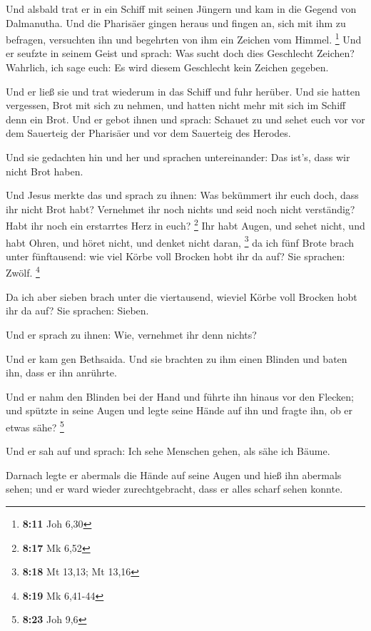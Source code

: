  Und alsbald trat er in ein Schiff mit seinen Jüngern und
kam in die Gegend von Dalmanutha.  Und die Pharisäer
gingen heraus und fingen an, sich mit ihm zu befragen, versuchten ihn
und begehrten von ihm ein Zeichen vom Himmel. \footnote{\textbf{8:11}
  Joh 6,30}  Und er seufzte in seinem Geist und sprach:
Was sucht doch dies Geschlecht Zeichen? Wahrlich, ich sage euch: Es wird
diesem Geschlecht kein Zeichen gegeben.

 Und er ließ sie und trat wiederum in das Schiff und fuhr
herüber.  Und sie hatten vergessen, Brot mit sich zu
nehmen, und hatten nicht mehr mit sich im Schiff denn ein Brot.
 Und er gebot ihnen und sprach: Schauet zu und sehet euch
vor vor dem Sauerteig der Pharisäer und vor dem Sauerteig des Herodes.

 Und sie gedachten hin und her und sprachen
untereinander: Das ist's, dass wir nicht Brot haben.

 Und Jesus merkte das und sprach zu ihnen: Was bekümmert
ihr euch doch, dass ihr nicht Brot habt? Vernehmet ihr noch nichts und
seid noch nicht verständig? Habt ihr noch ein erstarrtes Herz in euch?
\footnote{\textbf{8:17} Mk 6,52}  Ihr habt Augen, und
sehet nicht, und habt Ohren, und höret nicht, und denket nicht daran,
\footnote{\textbf{8:18} Mt 13,13; Mt 13,16}  da ich fünf
Brote brach unter fünftausend: wie viel Körbe voll Brocken hobt ihr da
auf? Sie sprachen: Zwölf. \footnote{\textbf{8:19} Mk 6,41-44}

 Da ich aber sieben brach unter die viertausend, wieviel
Körbe voll Brocken hobt ihr da auf? Sie sprachen: Sieben.

 Und er sprach zu ihnen: Wie, vernehmet ihr denn nichts?

 Und er kam gen Bethsaida. Und sie brachten zu ihm einen
Blinden und baten ihn, dass er ihn anrührte.

 Und er nahm den Blinden bei der Hand und führte ihn
hinaus vor den Flecken; und spützte in seine Augen und legte seine Hände
auf ihn und fragte ihn, ob er etwas sähe? \footnote{\textbf{8:23} Joh
  9,6}

 Und er sah auf und sprach: Ich sehe Menschen gehen, als
sähe ich Bäume.

 Darnach legte er abermals die Hände auf seine Augen und
hieß ihn abermals sehen; und er ward wieder zurechtgebracht, dass er
alles scharf sehen konnte.

